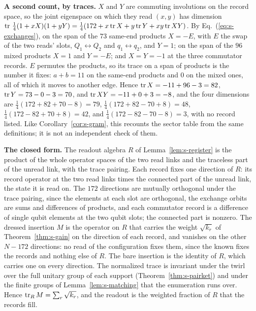 \textbf{A second count, by traces.} $X$ and $Y$ are commuting involutions on the record space, so the joint eigenspace on which they read $(x,y)$ has dimension $\operatorname{tr}\,\tfrac{1}{4}(1+xX)(1+yY)=\tfrac{1}{4}(172+x\operatorname{tr} X+y\operatorname{tr} Y+xy\operatorname{tr} XY)$. By Eq.~(\ref{eq:s-exchanges}), on the span of the $73$ same-end products $X=-E$, with $E$ the swap of the two reads' slots, $Q_{1}\leftrightarrow Q_{2}$ and $q_{1}\leftrightarrow q_{2}$, and $Y=1$; on the span of the $96$ mixed products $X=1$ and $Y=-E$; and $X=Y=-1$ at the three commutator records. $E$ permutes the products, so its trace on a span of products is the number it fixes: $a+b=11$ on the same-end products and $0$ on the mixed ones, all of which it moves to another edge. Hence $\operatorname{tr} X=-11+96-3=82$, $\operatorname{tr} Y=73-0-3=70$, and $\operatorname{tr} XY=-11+0+3=-8$, and the four dimensions are $\tfrac{1}{4}(172+82+70-8)=79$, $\tfrac{1}{4}(172+82-70+8)=48$, $\tfrac{1}{4}(172-82+70+8)=42$, and $\tfrac{1}{4}(172-82-70-8)=3$, with no record listed. Like Corollary~\ref{cor:s-gram}, this recounts the sector table from the same definitions; it is not an independent check of them.

\textbf{The closed form.} The readout algebra $R$ of Lemma~\ref{lem:s-register} is the product of the whole operator spaces of the two read links and the traceless part of the unread link, with the trace pairing. Each record fixes one direction of $R$: its record operator at the two read links times the connected part of the unread link, the state it is read on. The $172$ directions are mutually orthogonal under the trace pairing, since the elements at each slot are orthogonal, the exchange orbits are sums and differences of products, and each commutator record is a difference of single qubit elements at the two qubit slots; the connected part is nonzero. The dressed insertion $M$ is the operator on $R$ that carries the weight $\sqrt{k_{r}}$ of Theorem~\ref{thm:s-gain} on the direction of each record, and vanishes on the other $N-172$ directions: no read of the configuration fixes them, since the known fixes the records and nothing else of $R$. The bare insertion is the identity of $R$, which carries one on every direction. The normalized trace is invariant under the twirl over the full unitary group of each support (Theorem~\ref{thm:s-pairket}) and under the finite groups of Lemma~\ref{lem:s-matching} that the enumeration runs over. Hence $\operatorname{tr}_{R}M=\sum_{r}\sqrt{k_{r}}$, and the readout is the weighted fraction of $R$ that the records fill.

